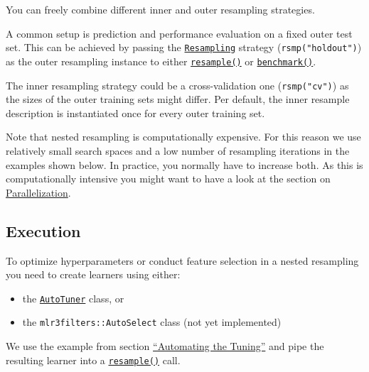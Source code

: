 \documentclass[]{scrbook}
\providecommand{\tightlist}{%
  \setlength{\itemsep}{0pt}\setlength{\parskip}{0pt}}
\begin{document}
You can freely combine different inner and outer resampling strategies.

A common setup is prediction and performance evaluation on a fixed outer test set.
This can be achieved by passing the \href{https://mlr3.mlr-org.com/reference/Resampling.html}{\texttt{Resampling}} strategy (\texttt{rsmp("holdout")}) as the outer resampling instance to either \href{https://mlr3.mlr-org.com/reference/resample.html}{\texttt{resample()}} or \href{https://mlr3.mlr-org.com/reference/benchmark.html}{\texttt{benchmark()}}.

The inner resampling strategy could be a cross-validation one (\texttt{rsmp("cv")}) as the sizes of the outer training sets might differ.
Per default, the inner resample description is instantiated once for every outer training set.

Note that nested resampling is computationally expensive.
For this reason we use relatively small search spaces and a low number of resampling iterations in the examples shown below.
In practice, you normally have to increase both.
As this is computationally intensive you might want to have a look at the section on \protect\hyperlink{parallelization}{Parallelization}.

\hypertarget{nested-resamp-exec}{%
\subsection{Execution}\label{nested-resamp-exec}}

To optimize hyperparameters or conduct feature selection in a nested resampling you need to create learners using either:

\begin{itemize}
\tightlist
\item
  the \href{https://mlr3tuning.mlr-org.com/reference/AutoTuner.html}{\texttt{AutoTuner}} class, or
\item
  the \texttt{mlr3filters::AutoSelect} class (not yet implemented)
\end{itemize}

We use the example from section \protect\hyperlink{autotuner}{``Automating the Tuning''} and pipe the resulting learner into a \href{https://mlr3.mlr-org.com/reference/resample.html}{\texttt{resample()}} call.
\end{document}
